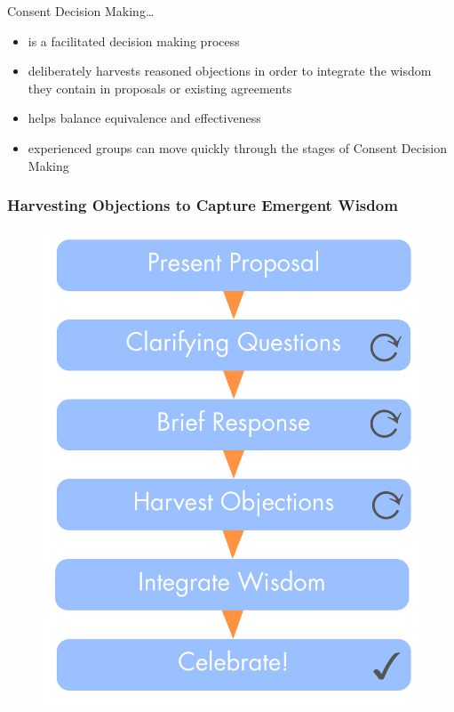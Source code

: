 Consent Decision Making{\ldots}

\begin{itemize}
\item is a facilitated decision making process

\item deliberately harvests reasoned objections in order to integrate the wisdom they contain in proposals or existing agreements

\item helps balance equivalence and effectiveness

\item experienced groups can move quickly through the stages of Consent Decision Making

\end{itemize}

\subsubsection{Harvesting Objections to Capture Emergent Wisdom}
\label{harvestingobjectionstocaptureemergentwisdom}

\begin{figure}[htbp]
\centering
\includegraphics[keepaspectratio,width=\textwidth,height=0.75\textheight]{img/consent-decision-making/cdm-small.png}
\end{figure}


